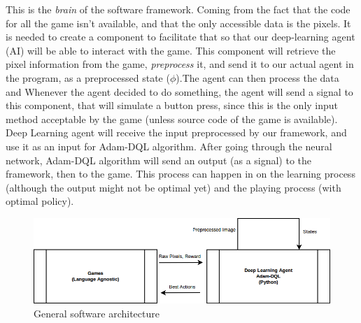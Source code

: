         This is the \textit{brain} of the software framework. Coming from the fact that the code for all the game isn't available, and that the only accessible data is the pixels. It is needed to create a component to facilitate that so that our deep-learning agent (AI) will be able to interact with the game. This component will retrieve the pixel information from the game, \textit{preprocess} it, and send it to our actual agent in the program, as a preprocessed state ($\phi$).The agent can then process the data and  Whenever the agent decided to do something, the agent will send a signal to this component, that will simulate a button press, since this is the only input method acceptable by the game (unless source code of the game is available). Deep Learning agent will receive the input preprocessed by our framework, and use it as an input for Adam-DQL algorithm. After going through the neural network, Adam-DQL algorithm will send an output (as a signal) to the framework, then to the game. This process can happen in on the learning process (although the output might not be optimal yet) and the playing process (with optimal policy).
    
    \begin{figure}[H]
        \centering
        \includegraphics[scale=0.4]{images/framework2block.png}
        \caption{General software architecture}
        \label{fig:41}
    \end{figure}
    
